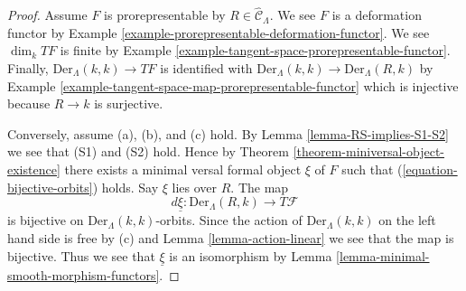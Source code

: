 \documentclass[10pt,a4paper]{amsart}
\theoremstyle{plain}
\theoremstyle{definition}
\theoremstyle{remark}
\numberwithin{equation}{subsection}
\begin{document}
\begin{proof}
Assume $F$ is prorepresentable by $R \in \widehat{\mathcal{C}}_\Lambda$.
We see $F$ is a deformation functor by
Example \ref{example-prorepresentable-deformation-functor}.
We see $\dim_k TF$ is finite by
Example \ref{example-tangent-space-prorepresentable-functor}.
Finally, $\text{Der}_\Lambda(k, k) \to TF$ is identified with
$\text{Der}_\Lambda(k, k) \to \text{Der}_\Lambda(R, k)$ by
Example \ref{example-tangent-space-map-prorepresentable-functor}
which is injective because $R \to k$ is surjective.

\medskip\noindent
Conversely, assume (a), (b), and (c) hold. By
Lemma \ref{lemma-RS-implies-S1-S2}
we see that (S1) and (S2) hold. Hence by
Theorem \ref{theorem-miniversal-object-existence}
there exists a minimal versal formal object $\xi$ of $F$ such that
(\ref{equation-bijective-orbits}) holds. Say $\xi$ lies over $R$.
The map
$$
d\underline{\xi} : \text{Der}_\Lambda(R, k) \to T\mathcal{F}
$$
is bijective on $\text{Der}_\Lambda(k, k)$-orbits. Since the action
of $\text{Der}_\Lambda(k, k)$ on the left hand side is free by (c) and
Lemma \ref{lemma-action-linear}
we see that the map is bijective. Thus we see that $\underline{\xi}$
is an isomorphism by
Lemma \ref{lemma-minimal-smooth-morphism-functors}.
\end{proof}
\end{document}

